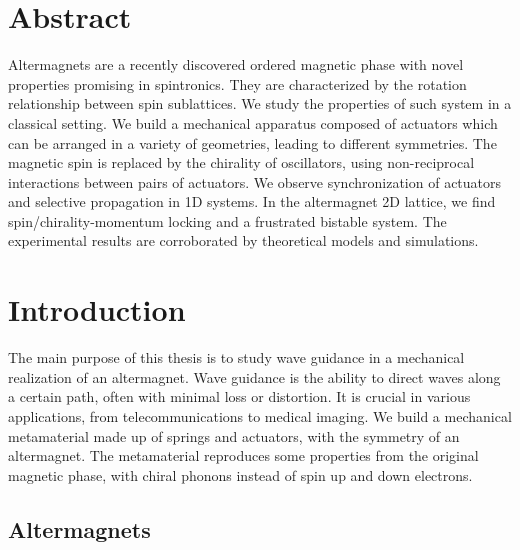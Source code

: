 \documentclass[11pt, a4paper]{article} %
\begin{document}
\section*{Abstract}

Altermagnets are a recently discovered ordered magnetic phase with novel properties promising in spintronics. 
They are characterized by the rotation relationship between spin sublattices. 
We study the properties of such system in a classical setting. 
We build a mechanical apparatus composed of actuators which can be arranged in a variety of geometries, leading to different symmetries. 
The magnetic spin is replaced by the chirality of oscillators, using non-reciprocal interactions between pairs of actuators. 
We observe synchronization of actuators and selective propagation in 1D systems. 
In the altermagnet 2D lattice, we find spin/chirality-momentum locking and a frustrated bistable system.
The experimental results are corroborated by theoretical models and simulations. 

\newpage
\tableofcontents
\newpage

\section{Introduction}
\label{sec:intro}


The main purpose of this thesis is to study wave guidance in a mechanical realization of an altermagnet. 
Wave guidance is the ability to direct waves along a certain path, often with minimal loss or distortion. 
It is crucial in various applications, from telecommunications to medical imaging. 
We build a mechanical metamaterial made up of springs and actuators, with the symmetry of an altermagnet. 
The metamaterial reproduces some properties from the original magnetic phase, with chiral phonons instead of 
spin up and down electrons. 


\subsection{Altermagnets}
\label{subsec:altermagnets}
\end{document}
